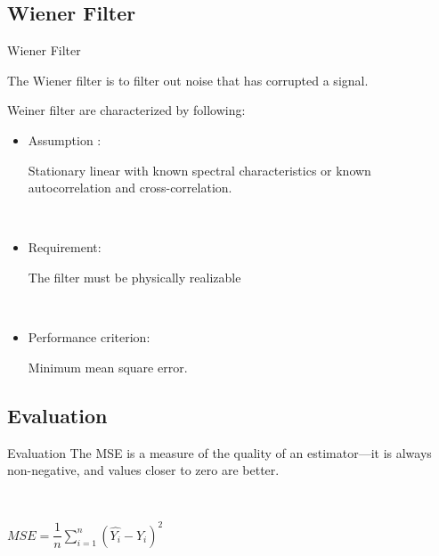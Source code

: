 \documentclass{beamer}
\begin{document}
\subsection{Wiener Filter}
\begin{frame}{Wiener Filter}

The Wiener filter is to filter out noise that has corrupted a signal.
\vspace{1cm}

Weiner filter are characterized by following:
\begin{itemize}
	\item Assumption :
	
	Stationary linear with known spectral characteristics or
	known autocorrelation and cross-correlation.


\

	\item Requirement:
	
	The filter must be physically realizable

\

	\item Performance criterion: 
	
	Minimum mean square error.

\end{itemize} 
\end{frame}

\subsection{Evaluation}
\begin{frame}{Evaluation}
The MSE is a measure of the quality of an estimator—it is always non-negative, and values closer to zero are better.


\

\begin{center}

	$MSE =  \dfrac{1}{n} \displaystyle \sum_{i=1}^{n}(\hat{Y_i} - Y_i)^2$
	

\end{center}
 

\end{frame}
\end{document}
